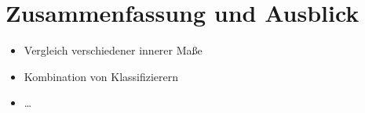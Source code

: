 \chapter{Zusammenfassung und Ausblick}

\TODO

\begin{itemize}
  \item Vergleich verschiedener innerer Maße
  \item Kombination von Klassifizierern
  \item \dots
\end{itemize}